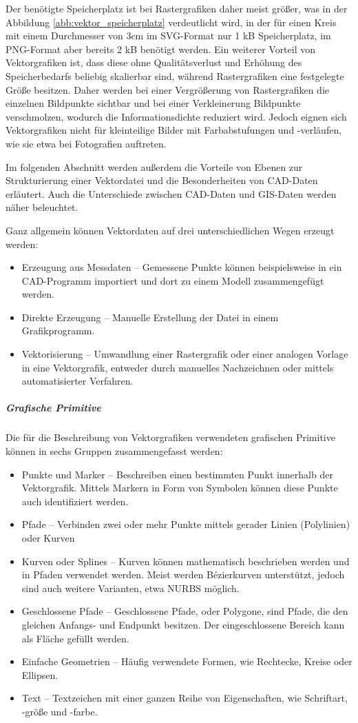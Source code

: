 Der benötigte Speicherplatz ist bei Rastergrafiken daher meist größer, was in der Abbildung \ref{abb:vektor_speicherplatz} verdeutlicht wird, in der für einen Kreis mit einem Durchmesser von 3cm im SVG-Format nur 1 kB Speicherplatz, im PNG-Format aber bereits 2 kB benötigt werden. Ein weiterer Vorteil von Vektorgrafiken ist, dass diese ohne Qualitätsverlust und Erhöhung des Speicherbedarfs beliebig skalierbar sind, während Rastergrafiken eine festgelegte Größe besitzen. Daher werden bei einer Vergrößerung von Rastergrafiken die einzelnen Bildpunkte sichtbar und bei einer Verkleinerung Bildpunkte verschmolzen, wodurch die Informationsdichte reduziert wird. Jedoch eignen sich Vektorgrafiken nicht für kleinteilige Bilder mit Farbabstufungen und -verläufen, wie sie etwa bei Fotografien auftreten.

Im folgenden Abschnitt werden außerdem die Vorteile von Ebenen zur Strukturierung einer Vektordatei und die Besonderheiten von CAD-Daten erläutert. Auch die Unterschiede zwischen CAD-Daten und GIS-Daten werden näher beleuchtet.

Ganz allgemein können Vektordaten auf drei unterschiedlichen Wegen erzeugt werden:
\begin{itemize}
	\item Erzeugung aus Messdaten -- Gemessene Punkte können beispielsweise in ein CAD-Programm importiert und dort zu einem Modell zusammengefügt werden.
	\item Direkte Erzeugung -- Manuelle Erstellung der Datei in einem Grafikprogramm.
	\item Vektorisierung -- Umwandlung einer Rastergrafik oder einer analogen Vorlage in eine Vektorgrafik, entweder durch manuelles Nachzeichnen oder mittels automatisierter Verfahren.
\end{itemize}


\subparagraph{Grafische Primitive}
Die für die Beschreibung von Vektorgrafiken verwendeten grafischen Primitive können in sechs Gruppen zusammengefasst werden: 
\begin{itemize}
	\item Punkte und Marker -- Beschreiben einen bestimmten Punkt innerhalb der Vektorgrafik. Mittels Markern in Form von Symbolen können diese Punkte auch identifiziert werden. 
	\item Pfade -- Verbinden zwei oder mehr Punkte mittels gerader Linien (Polylinien) oder Kurven
	\item Kurven oder Splines -- Kurven können mathematisch beschrieben werden und in Pfaden verwendet werden. Meist werden Bézierkurven unterstützt, jedoch sind auch weitere Varianten, etwa NURBS möglich.
	\item Geschlossene Pfade -- Geschlossene Pfade, oder Polygone, sind Pfade, die den gleichen Anfangs- und Endpunkt besitzen. Der eingeschlossene Bereich kann als Fläche gefüllt werden.
	\item Einfache Geometrien -- Häufig verwendete Formen, wie Rechtecke, Kreise oder Ellipsen.
	\item Text -- Textzeichen mit einer ganzen Reihe von Eigenschaften, wie Schriftart, -größe und -farbe.
\end{itemize}

